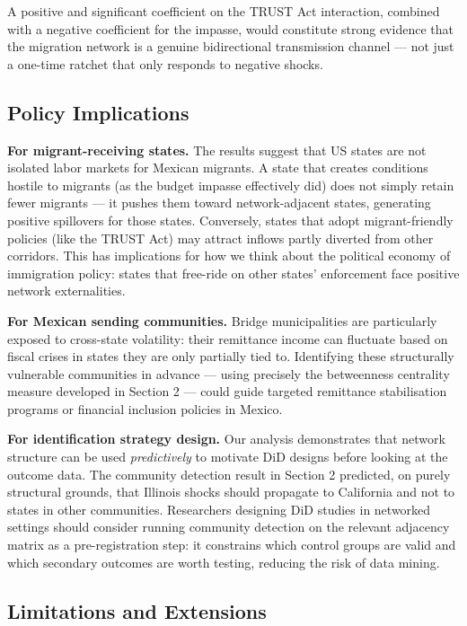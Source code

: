 \documentclass[
  11pt,
  letterpaper,
  DIV=11,
  numbers=noendperiod]{scrartcl}
\begin{document}
A positive and significant coefficient on the TRUST Act interaction,
combined with a negative coefficient for the impasse, would constitute
strong evidence that the migration network is a genuine bidirectional
transmission channel --- not just a one-time ratchet that only responds
to negative shocks.

\subsection{Policy Implications}\label{policy-implications}

\textbf{For migrant-receiving states.} The results suggest that US
states are not isolated labor markets for Mexican migrants. A state that
creates conditions hostile to migrants (as the budget impasse
effectively did) does not simply retain fewer migrants --- it pushes
them toward network-adjacent states, generating positive spillovers for
those states. Conversely, states that adopt migrant-friendly policies
(like the TRUST Act) may attract inflows partly diverted from other
corridors. This has implications for how we think about the political
economy of immigration policy: states that free-ride on other states'
enforcement face positive network externalities.

\textbf{For Mexican sending communities.} Bridge municipalities are
particularly exposed to cross-state volatility: their remittance income
can fluctuate based on fiscal crises in states they are only partially
tied to. Identifying these structurally vulnerable communities in
advance --- using precisely the betweenness centrality measure developed
in Section 2 --- could guide targeted remittance stabilisation programs
or financial inclusion policies in Mexico.

\textbf{For identification strategy design.} Our analysis demonstrates
that network structure can be used \emph{predictively} to motivate DiD
designs before looking at the outcome data. The community detection
result in Section 2 predicted, on purely structural grounds, that
Illinois shocks should propagate to California and not to states in
other communities. Researchers designing DiD studies in networked
settings should consider running community detection on the relevant
adjacency matrix as a pre-registration step: it constrains which control
groups are valid and which secondary outcomes are worth testing,
reducing the risk of data mining.

\subsection{Limitations and
Extensions}\label{limitations-and-extensions}
\end{document}
